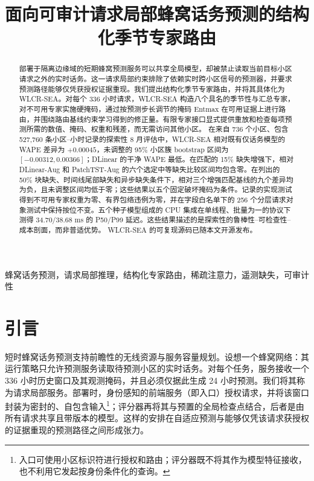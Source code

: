 \documentclass[10pt,conference,letterpaper]{IEEEtran}
\title{面向可审计请求局部蜂窝话务预测的结构化季节专家路由}
\author{\IEEEauthorblockN{匿名作者}
\IEEEauthorblockA{匿名机构\\匿名邮箱}}
\begin{document}
\maketitle

\begin{abstract}
部署于隔离边缘域的短期蜂窝预测服务可以共享全局模型，却被禁止读取当前目标小区请求之外的实时话务。这一请求局部约束排除了依赖实时跨小区信号的预测器，并要求预测路径能够仅凭获授权证据重现。我们提出结构化季节专家路由，并将其具体化为 WLCR-SEA。对每个 336 小时请求，WLCR-SEA 构造八个具名的季节性与汇总专家，对不可用专家实施硬掩码，通过按预测步长调节的掩码 Entmax 在可用证据上进行路由，并围绕路由基线约束学习得到的修正量。有限专家接口显式提供重放和检查每项预测所需的数值、掩码、权重和残差，而无需访问其他小区。
在来自 736 个小区、包含 527,760 条小区--小时记录的探索性 8 月评估中，WLCR-SEA 相对既有仅话务模型的 WAPE 差异为 $+0.00045$，未调整的 95\% 小区簇 bootstrap 区间为 $[-0.00312,0.00366]$；DLinear 的干净 WAPE 最低。在匹配的 15\% 缺失增强下，相对 DLinear-Aug 和 PatchTST-Aug 的六个选定中等缺失比较区间均包含零。在列出的 50\% 块缺失、时间线尾部缺失和异步缺失条件下，相对三个增强匹配基线的九个差异均为负，且未调整区间均低于零；这些结果以五个固定破坏掩码为条件。记录的实现测试得到不可用专家权重为零、有界包络违例为零，并在字段白名单下的 256 个分层请求对象测试中保持按位不变。五个种子模型组成的 CPU 集成在单线程、批量为一的协议下测得 34.70/38.68 ms 的 P50/P99 延迟。这些结果描述的是探索性的鲁棒性--可检查性--成本剖面，而非普适优势。
WLCR-SEA 的可复现源码已随本文开源发布。
\end{abstract}

\begin{IEEEkeywords}
蜂窝话务预测，请求局部推理，结构化专家路由，稀疏注意力，遥测缺失，可审计性
\end{IEEEkeywords}

\section{引言}
短时蜂窝话务预测支持前瞻性的无线资源与服务容量规划。设想一个蜂窝网络：其运行策略只允许预测服务读取待预测小区的实时话务。对每个任务，服务接收一个 336 小时历史窗口及其观测掩码，并且必须仅据此生成 24 小时预测。我们将其称为请求局部服务。部署时，身份感知的前端服务（即入口）授权请求，并将该窗口封装为密封的、自包含输入\footnote{入口可使用小区标识符进行授权和路由；评分器既不将其作为模型特征接收，也不利用它发起按身份条件化的查询。}；评分器再将其与预置的全局检查点结合，后者是由所有请求共享且带版本的模型。这样的安排在自适应预测与能够仅凭该请求获授权的证据重现的预测路径之间形成张力。
\end{document}
